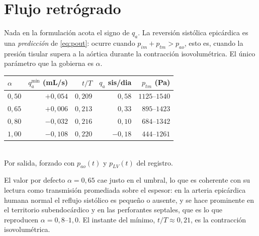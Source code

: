 \documentclass[11pt]{article}
\begin{document}
\section{Flujo retr\'ogrado}
\label{sec:back}

Nada en la formulaci\'on acota el signo de $q_a$. La reversi\'on sist\'olica
epic\'ardica es una \emph{predicci\'on} de \eqref{eq:pout}: ocurre cuando
$p_{im}+p_{tm}>p_{ao}$, esto es, cuando la presi\'on tisular supera a la
a\'ortica durante la contracci\'on isovolum\'etrica. El \'unico par\'ametro que
la gobierna es $\alpha$.

\begin{center}\small
\begin{tabular}{lrrrr}
\toprule
$\alpha$ & $q_a^{\min}$ (mL/s) & $t/T$ & $q_a$ sis/dia & $p_{tm}$ (Pa)\\
\midrule
$0{,}50$ & $+0{,}054$ & $0{,}209$ & $0{,}58$ & $1125$--$1540$\\
$0{,}65$ & $+0{,}006$ & $0{,}213$ & $0{,}33$ & $895$--$1423$\\
$0{,}80$ & $-0{,}032$ & $0{,}216$ & $0{,}10$ & $684$--$1342$\\
$1{,}00$ & $-0{,}108$ & $0{,}220$ & $-0{,}18$ & $444$--$1261$\\
\bottomrule
\end{tabular}\\[2pt]
\footnotesize Por salida, forzado con $p_{ao}(t)$ y $p_{LV}(t)$ del registro.
\end{center}

\noindent
El valor por defecto $\alpha=0{,}65$ cae justo en el umbral, lo que es
coherente con su lectura como transmisi\'on promediada sobre el espesor: en la
arteria epic\'ardica humana normal el reflujo sist\'olico es peque\~no o
ausente, y se hace prominente en el territorio subendoc\'ardico y en las
perforantes septales, que es lo que reproducen $\alpha=0{,}8$--$1{,}0$. El
instante del m\'inimo, $t/T\approx0{,}21$, es la contracci\'on isovolum\'etrica.
\end{document}
